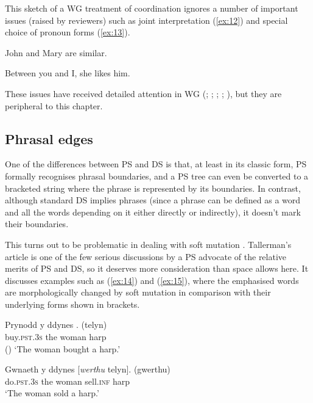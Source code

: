 \documentclass[output=paper,biblatex,babelshorthands,newtxmath,draftmode,colorlinks,citecolor=brown]{langscibook}
\begin{document}
This sketch of a WG treatment of coordination ignores a number of important issues (raised by
reviewers) such as joint interpretation (\ref{ex:12}) and special choice of pronoun forms
(\ref{ex:13}).

\begin{exe}
	\ex \label{ex:12} John and Mary are similar.

	\ex \label{ex:13} Between you and I, she likes him.
\end{exe}

\noindent
These issues have received detailed attention in WG (\citealt[Chapter~5]{Hudson84a-u};
\citeyear{Hudson88a}; \citeyear[Chapter~14]{Hudson90a-u}; \citeyear{Hudson1995}; \citeyear[175--181,
304--307]{Hudson2010b-u}), but they are peripheral to this chapter.


\subsection{Phrasal edges}
\label{sec:4.3}

One of the differences between PS and DS is that, at least in its classic form, PS formally
recognises phrasal boundaries, and a PS tree can even be converted to a bracketed string where the
phrase is represented by its boundaries. In contrast, although standard DS implies phrases (since a
phrase can be defined as a word and all the words depending on it either directly or indirectly), it
doesn't mark their boundaries.

This turns out to be problematic in dealing with  soft mutation
\citep{Tallerman2009}. Tallerman's article is one of the few serious discussions by a PS advocate of
the relative merits of PS and DS, so it deserves more consideration than space allows here. It
discusses examples such as (\ref{ex:14}) and (\ref{ex:15}), where the emphasised words are
morphologically changed by soft mutation in comparison with their underlying forms shown in
brackets.

\begin{exe}
\ex \label{ex:14}
\gll Prynodd                      y   ddynes \emph{}. (telyn)\\
     buy.\textsc{pst}.3\textsc{s} the woman  harp\\\hfill()
\glt `The woman bought a harp.'

\ex \label{ex:15}
\gll Gwnaeth                     y   ddynes [\emph{werthu} telyn]. (gwerthu)\\
     do.\textsc{pst}.3\textsc{s} the woman  \spacebr{}sell.\textsc{inf} harp\\
\glt `The woman sold a harp.'
\end{exe}
\end{document}
